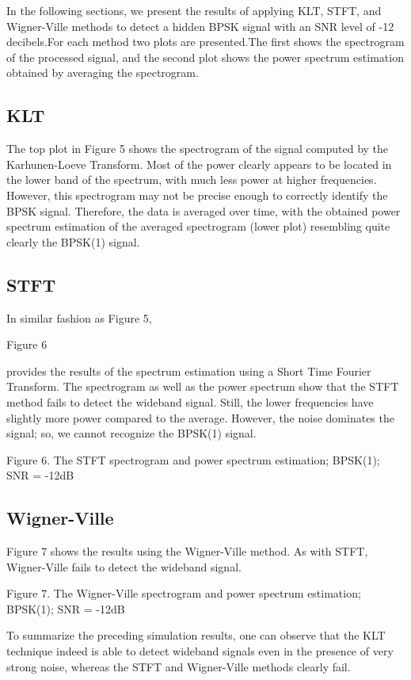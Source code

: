 \documentclass[12pt]{report}
\begin{document}
In the following sections, we present the results of applying KLT, STFT, and Wigner-Ville methods to detect a hidden BPSK signal with an SNR level of -12 decibels.\@ For each method two plots are presented.\@ The first shows the spectrogram of the processed signal, and the second plot shows the power spectrum estimation obtained by averaging the spectrogram.
\subsection*{KLT}
The top plot in Figure 5 shows the spectrogram of the signal computed by the
Karhunen-Loeve Transform. Most of the power clearly appears to be located
in the lower band of the spectrum, with much less power at higher frequencies.
However, this spectrogram may not be precise enough to correctly identify the
BPSK signal. Therefore, the data is averaged over time, with the obtained power
spectrum estimation of the averaged spectrogram (lower plot) resembling
quite clearly the BPSK(1) signal.
\subsection*{STFT}
In similar fashion as Figure 5, \begin{normalsize}\color{red}Figure 6\end{normalsize} provides the results of the spectrum
estimation using a Short Time Fourier Transform. The spectrogram as well as the power spectrum show that the STFT method fails to detect the wideband signal.
Still, the lower frequencies have slightly more power compared to the average. However, the noise dominates the signal; so, we cannot recognize the
BPSK(1) signal.
\begin{center}
	\color{blue}Figure 6. The STFT spectrogram and power spectrum estimation; BPSK(1); SNR = -12dB
\end{center}
\subsection*{Wigner-Ville}
Figure 7 shows the results using the Wigner-Ville method. As with STFT, Wigner-Ville fails to detect the wideband signal.
\begin{center}
	\color{blue}Figure 7. The Wigner-Ville spectrogram and power spectrum estimation; BPSK(1); SNR = -12dB
\end{center}
To summarize the preceding simulation results, one can observe that the KLT technique indeed is able to detect wideband signals even in the presence of very strong noise, whereas the STFT and Wigner-Ville methods clearly fail.
\end{document}
